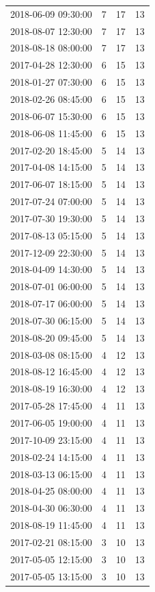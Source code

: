 \begin{tabular}{lrrr}
2018-06-09 09:30:00 & 7 & 17 & 13 \\
2018-08-07 12:30:00 & 7 & 17 & 13 \\
2018-08-18 08:00:00 & 7 & 17 & 13 \\
2017-04-28 12:30:00 & 6 & 15 & 13 \\
2018-01-27 07:30:00 & 6 & 15 & 13 \\
2018-02-26 08:45:00 & 6 & 15 & 13 \\
2018-06-07 15:30:00 & 6 & 15 & 13 \\
2018-06-08 11:45:00 & 6 & 15 & 13 \\
2017-02-20 18:45:00 & 5 & 14 & 13 \\
2017-04-08 14:15:00 & 5 & 14 & 13 \\
2017-06-07 18:15:00 & 5 & 14 & 13 \\
2017-07-24 07:00:00 & 5 & 14 & 13 \\
2017-07-30 19:30:00 & 5 & 14 & 13 \\
2017-08-13 05:15:00 & 5 & 14 & 13 \\
2017-12-09 22:30:00 & 5 & 14 & 13 \\
2018-04-09 14:30:00 & 5 & 14 & 13 \\
2018-07-01 06:00:00 & 5 & 14 & 13 \\
2018-07-17 06:00:00 & 5 & 14 & 13 \\
2018-07-30 06:15:00 & 5 & 14 & 13 \\
2018-08-20 09:45:00 & 5 & 14 & 13 \\
2018-03-08 08:15:00 & 4 & 12 & 13 \\
2018-08-12 16:45:00 & 4 & 12 & 13 \\
2018-08-19 16:30:00 & 4 & 12 & 13 \\
2017-05-28 17:45:00 & 4 & 11 & 13 \\
2017-06-05 19:00:00 & 4 & 11 & 13 \\
2017-10-09 23:15:00 & 4 & 11 & 13 \\
2018-02-24 14:15:00 & 4 & 11 & 13 \\
2018-03-13 06:15:00 & 4 & 11 & 13 \\
2018-04-25 08:00:00 & 4 & 11 & 13 \\
2018-04-30 06:30:00 & 4 & 11 & 13 \\
2018-08-19 11:45:00 & 4 & 11 & 13 \\
2017-02-21 08:15:00 & 3 & 10 & 13 \\
2017-05-05 12:15:00 & 3 & 10 & 13 \\
2017-05-05 13:15:00 & 3 & 10 & 13 \\

\end{tabular}
